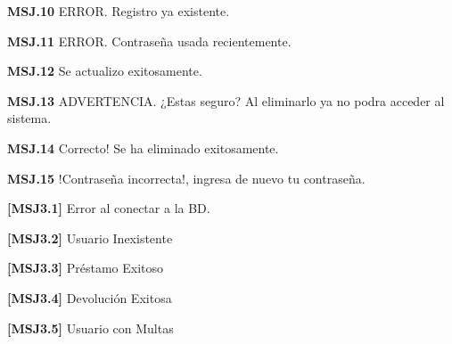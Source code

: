 	\begin{Citemize}
	\item {\bf MSJ.10} ERROR. Registro ya existente.
	\end{Citemize}
	
	\begin{Citemize}
	\item {\bf MSJ.11} ERROR. Contraseña usada recientemente.
	\end{Citemize}
	
	\begin{Citemize}
	\item {\bf MSJ.12} Se actualizo exitosamente.
	\end{Citemize}
	
	\begin{Citemize}
	\item {\bf MSJ.13} ADVERTENCIA. ¿Estas seguro? Al eliminarlo ya no podra acceder al sistema.
	\end{Citemize}
	
	\begin{Citemize}
	\item {\bf MSJ.14} Correcto! Se ha eliminado exitosamente.
	\end{Citemize}
	
	\begin{Citemize}
	\item {\bf MSJ.15} !Contraseña incorrecta!, ingresa de nuevo tu contraseña.
	\end{Citemize}

	\begin{Citemize}
	\item {\bf [MSJ3.1]} Error al conectar a la BD.
	\end{Citemize}

	\begin{Citemize}
	\item {\bf [MSJ3.2]} Usuario Inexistente
	\end{Citemize}
	
	\begin{Citemize}
	\item {\bf [MSJ3.3]} Préstamo Exitoso
	\end{Citemize}
	
	\begin{Citemize}
	\item {\bf [MSJ3.4]} Devolución Exitosa
	\end{Citemize}
	
	\begin{Citemize}
	\item {\bf [MSJ3.5]} Usuario con Multas
	\end{Citemize}
	
